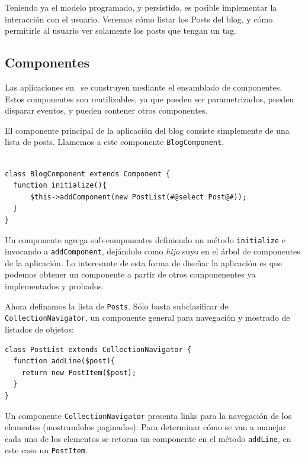 Teniendo ya el modelo programado, y persistido, es posible implementar la interacción con el usuario. Veremos cómo listar los Posts del blog, y cómo permitirle al usuario ver solamente los posts que tengan un tag.

\subsection{Componentes}
\label{sub-comp}

Las aplicaciones en \PWB\ se construyen mediante el ensamblado de componentes. Estos componentes son reutilizables, ya que pueden ser parametrizados, pueden disparar eventos, y pueden contener otros componentes.

El componente principal de la aplicación del blog consiste simplemente de una lista de posts. Llamemos a este componente \verb"BlogComponent".

\begin{verbatim}

class BlogComponent extends Component {
  function initialize(){
      $this->addComponent(new PostList(#@select Post@#));
  }
}
\end{verbatim}

Un componente agrega sub-componentes definiendo un método \verb"initialize" e invocando a \verb"addComponent", dejándolo como \emph{hijo} suyo en el árbol de componentes de la aplicación. Lo interesante de esta forma de diseñar la aplicación es que podemos obtener un componente a partir de otros componenentes ya implementados y probados.


Ahora definamos la lista de \verb"Posts". Sólo basta subclasificar de \verb"CollectionNavigator", un componente general para navegación y mostrado de listados de objetos:

\begin{verbatim}
class PostList extends CollectionNavigator {
  function addLine($post){
    return new PostItem($post);
  }
}

\end{verbatim}

Un componente \verb"CollectionNavigator" presenta links para la navegación de los elementos (mostrandolos paginados). Para determinar cómo se van a manejar cada uno de los elementos se retorna un componente en el método \verb"addLine", en este caso un \verb'PostItem'.

